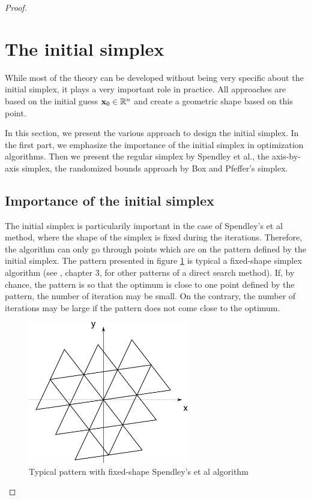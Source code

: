 \begin{proof}
\section{The initial simplex}

While most of the theory can be developed without being very specific 
about the initial simplex, it plays a very important role in practice.
All approaches are based on the initial guess $\mathbf{x}_0\in\mathbb{R}^n$ and create a 
geometric shape based on this point.

In this section, we present the various approach to design the initial 
simplex. In the first part, we emphasize the importance of the initial
simplex in optimization algorithms. Then we present the regular simplex 
by Spendley et al., the axis-by-axis simplex, the randomized bounds approach by Box and 
Pfeffer's simplex.

\subsection{Importance of the initial simplex}

The initial simplex is particularily important in the case of Spendley's et al 
method, where the shape of the simplex is fixed during the iterations.
Therefore, the algorithm can only go through points which are on the pattern
defined by the initial simplex. The pattern presented in figure \ref{fig-nm-simplex-fixedshape}
is typical a fixed-shape simplex algorithm (see \cite{Torczon89multi-directionalsearch}, chapter 3, 
for other patterns of a direct search method).
If, by chance, the pattern is so that the optimum is close to one point 
defined by the pattern, the number of iteration may be small. On the contrary, the 
number of iterations may be large if the pattern does not come close to the 
optimum.

\begin{figure}
\begin{center}
\includegraphics[width=7cm]{simplex_initialfixed.pdf}
\end{center}
\caption{Typical pattern with fixed-shape Spendley's et al algorithm}
\label{fig-nm-simplex-fixedshape}
\end{figure}


\end{proof}
